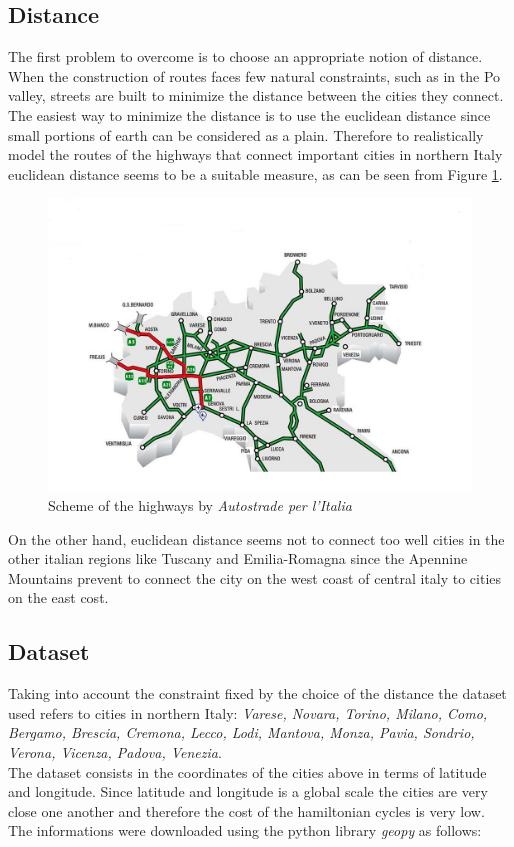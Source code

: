 \documentclass{article}
\begin{document}
\subsection{Distance}
The first problem to overcome is to choose an appropriate notion of distance. When the construction of routes faces few natural constraints, such as in the Po valley, streets are built to minimize the distance between the cities they connect. The easiest way to minimize the distance is to use the euclidean distance since small portions of earth can be considered as a plain. Therefore to realistically model the routes of the highways that connect important cities in northern Italy euclidean distance seems to be a suitable measure, as can be seen from Figure \ref{autostrade}.
\begin{figure}[H] 
\includegraphics[scale=0.4]{autostrade.jpg} 
\centering
\caption{Scheme of the highways by \textit{Autostrade per l'Italia}\cite{autostrade}} \label{autostrade}
\end{figure}
\noindent On the other hand, euclidean distance seems not to connect too well cities in the other italian regions like Tuscany and Emilia-Romagna since the Apennine Mountains prevent to connect the city on the west coast of central italy to cities on the east cost.


\subsection{Dataset}
Taking into account the constraint fixed by the choice of the distance the dataset used refers to cities in northern Italy: \textit{Varese, Novara, Torino, Milano, Como, Bergamo, Brescia, Cremona, Lecco, Lodi, Mantova, Monza, Pavia, Sondrio, Verona, Vicenza, Padova, Venezia}. \\
The dataset consists in the coordinates of the cities above in terms of latitude and longitude. Since latitude and longitude is a global scale the cities are very close one another and therefore the cost of the hamiltonian cycles is very low.\\
The informations were downloaded using the python library \textit{geopy} as follows:
\end{document}
